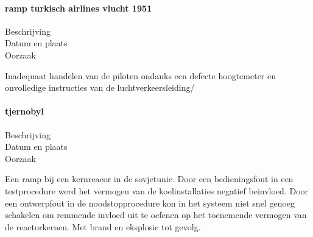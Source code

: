 \cite{aviationsafety04101992airplaneCrashBijlmer}

\paragraph{ramp turkisch airlines vlucht 1951}

\begin{description}
	\item[Beschrijving]
	\item[Datum en plaats] 
	\item[Oorzaak]
\end{description}
Inadequaat handelen van de piloten ondanks een defecte hoogtemeter en onvolledige instructies van de luchtverkeersleiding/

\cite{catsr25022009Boeing737AmsterdamCrash}

\cite{zuilen23022019Tijdlijnpoldercrash}
\cite{wikinews04032009techfoutailines1951}
\cite{luchtvaartnieuws21012020boeing737conclusies}
\cite{adformatie280220209communicatiegebreken}
\cite{spinnael25022009onderzoekpolderbaancrash}
\cite{crashTurkishAirlines}
\cite{flightradar24}
\cite{flightstatstracker}


\paragraph{tjernobyl}

\begin{description}
	\item[Beschrijving]
	\item[Datum en plaats] 
	\item[Oorzaak]
\end{description}
Een ramp bij een kernreacor in de sovjetunie. Door een bedieningsfout in een testprocedure werd het vermogen van de koelinstallaties negatief beinvloed. Door een ontwerpfout in de noodstopprocedure kon in het systeem niet snel genoeg schakelen om remmende invloed uit te oefenen op het toenemende vermogen van de reactorkernen. Met brand en eksplosie tot gevolg.

